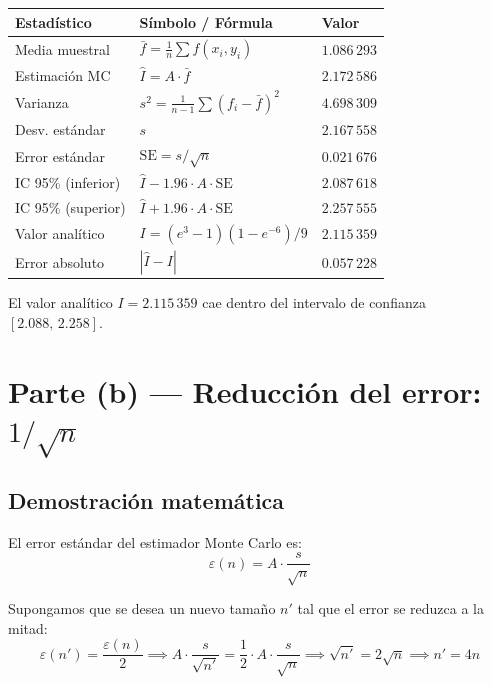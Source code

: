 \documentclass[12pt,a4paper]{article}
\begin{document}
\begin{center}
\renewcommand{\arraystretch}{1.4}
\begin{tabular}{lll}
\toprule
\textbf{Estad\'istico} & \textbf{S\'imbolo / F\'ormula} & \textbf{Valor} \\
\midrule
Media muestral & $\bar{f} = \frac{1}{n}\sum f(x_i,y_i)$ & $1.086\,293$ \\
Estimaci\'on MC & $\hat{I} = A\cdot\bar{f}$ & $2.172\,586$ \\
Varianza & $s^2 = \frac{1}{n-1}\sum(f_i-\bar{f})^2$ & $4.698\,309$ \\
Desv. est\'andar & $s$ & $2.167\,558$ \\
Error est\'andar & $\mathrm{SE} = s/\sqrt{n}$ & $0.021\,676$ \\
IC 95\% (inferior) & $\hat{I} - 1.96\cdot A\cdot\mathrm{SE}$ & $2.087\,618$ \\
IC 95\% (superior) & $\hat{I} + 1.96\cdot A\cdot\mathrm{SE}$ & $2.257\,555$ \\
Valor anal\'itico & $I = (e^3-1)(1-e^{-6})/9$ & $2.115\,359$ \\
Error absoluto & $|\hat{I} - I|$ & $0.057\,228$ \\
\bottomrule
\end{tabular}
\end{center}

El valor anal\'itico $I = 2.115\,359$ cae dentro del intervalo de confianza
$[2.088,\, 2.258]$. \checkmark

\section*{Parte (b) --- Reducci\'on del error: $1/\!\sqrt{n}$}

\subsection*{Demostraci\'on matem\'atica}

El error est\'andar del estimador Monte Carlo es:
\[
  \varepsilon(n) = A\cdot\frac{s}{\sqrt{n}}
\]

Supongamos que se desea un nuevo tama\~no $n'$ tal que el error se reduzca a
la mitad:
\[
  \varepsilon(n') = \frac{\varepsilon(n)}{2}
  \implies
  A\cdot\frac{s}{\sqrt{n'}} = \frac{1}{2}\cdot A\cdot\frac{s}{\sqrt{n}}
  \implies
  \sqrt{n'} = 2\sqrt{n}
  \implies
  \boxed{n' = 4n}
\]
\end{document}
